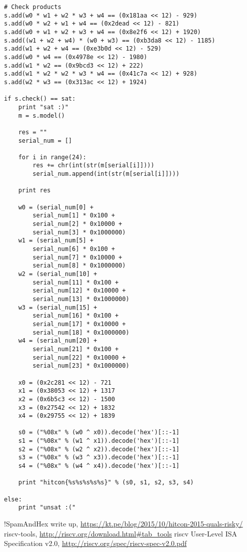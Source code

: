 \documentclass[a4paper,UTF8]{ctexart}
\begin{document}
\begin{verbatim}
# Check products
s.add(w0 * w1 + w2 * w3 + w4 == (0x181aa << 12) - 929)
s.add(w0 * w2 + w1 + w4 == (0x2dead << 12) - 821)
s.add(w0 + w1 + w2 + w3 + w4 == (0x8e2f6 << 12) + 1920)
s.add((w1 + w2 + w4) * (w0 + w3) == (0xb3da8 << 12) - 1185)
s.add(w1 + w2 + w4 == (0xe3b0d << 12) - 529)
s.add(w0 * w4 == (0x4978e << 12) - 1980)
s.add(w1 * w2 == (0x9bcd3 << 12) + 222)
s.add(w1 * w2 * w2 * w3 * w4 == (0x41c7a << 12) + 928)
s.add(w2 * w3 == (0x313ac << 12) + 1924)

if s.check() == sat:
    print "sat :)"
    m = s.model()

    res = ""
    serial_num = []

    for i in range(24):
        res += chr(int(str(m[serial[i]])))
        serial_num.append(int(str(m[serial[i]])))

    print res

    w0 = (serial_num[0] +
        serial_num[1] * 0x100 +
        serial_num[2] * 0x10000 +
        serial_num[3] * 0x1000000)
    w1 = (serial_num[5] +
        serial_num[6] * 0x100 +
        serial_num[7] * 0x10000 +
        serial_num[8] * 0x1000000)
    w2 = (serial_num[10] +
        serial_num[11] * 0x100 +
        serial_num[12] * 0x10000 +
        serial_num[13] * 0x1000000)
    w3 = (serial_num[15] +
        serial_num[16] * 0x100 +
        serial_num[17] * 0x10000 +
        serial_num[18] * 0x1000000)
    w4 = (serial_num[20] +
        serial_num[21] * 0x100 +
        serial_num[22] * 0x10000 +
        serial_num[23] * 0x1000000)

    x0 = (0x2c281 << 12) - 721
    x1 = (0x38053 << 12) + 1317
    x2 = (0x6b5c3 << 12) - 1500
    x3 = (0x27542 << 12) + 1832
    x4 = (0x29755 << 12) + 1839

    s0 = ("%08x" % (w0 ^ x0)).decode('hex')[::-1]
    s1 = ("%08x" % (w1 ^ x1)).decode('hex')[::-1]
    s2 = ("%08x" % (w2 ^ x2)).decode('hex')[::-1]
    s3 = ("%08x" % (w3 ^ x3)).decode('hex')[::-1]
    s4 = ("%08x" % (w4 ^ x4)).decode('hex')[::-1]

    print "hitcon{%s%s%s%s%s}" % (s0, s1, s2, s3, s4)

else:
    print "unsat :("

\end{verbatim}

\begin{thebibliography}{99}
\setlength{\parskip}{0pt}  %

 !SpamAndHex write up, \url{https://kt.pe/blog/2015/10/hitcon-2015-quals-risky/}
 riscv-tools, \url{http://riscv.org/download.html#tab_tools}
 riscv User-Level ISA Specification v2.0, \url{http://riscv.org/spec/riscv-spec-v2.0.pdf}
\end{thebibliography}

\end{document}
